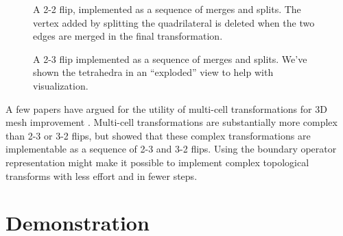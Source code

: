 \documentclass[twocolumn]{article}
\begin{document}
\begin{figure}[h]
\begin{center}
    \end{center}
    \caption{A 2-2 flip, implemented as a sequence of merges and splits.
    The vertex added by splitting the quadrilateral is deleted when the two edges are merged in the final transformation.}
    \label{fig:2-2-flip}
\end{figure}

\begin{figure}[h]
    \begin{center}
        
    \end{center}
    \caption{A 2-3 flip implemented as a sequence of merges and splits.
    We've shown the tetrahedra in an ``exploded'' view to help with visualization.}
    \label{fig:2-3-flip}
\end{figure}

A few papers have argued for the utility of multi-cell transformations for 3D mesh improvement \cite{klingner2008aggressive}.
Multi-cell transformations are substantially more complex than 2-3 or 3-2 flips, but \cite{misztal2009tetrahedral} showed that these complex transformations are implementable as a sequence of 2-3 and 3-2 flips.
Using the boundary operator representation might make it possible to implement complex topological transforms with less effort and in fewer steps.


\section{Demonstration}
\end{document}
